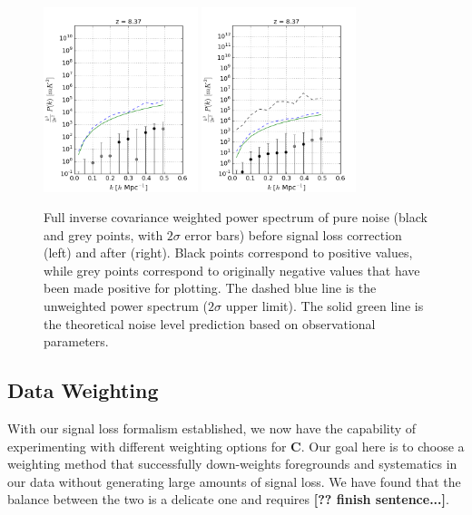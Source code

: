 \documentclass[preprint2,numberedappendix,tighten,twocolappendix]{aastex6}  %
\newcommand{\cc}[1]{{\color{purple} \textbf{[#1]}}}
\begin{document}
\begin{figure}
	\centering
	\includegraphics[width=0.4\textwidth]{plots/ps2_noise_nosigloss.png}
	\includegraphics[width=0.4\textwidth]{plots/ps2_noise.png}
	\caption{Full inverse covariance weighted power spectrum of pure noise (black and grey points, with $2\sigma$ error bars) before signal loss correction (left) and after (right). Black points correspond to positive values, while grey points correspond to originally negative values that have been made positive for plotting. The dashed blue line is the unweighted power spectrum ($2\sigma$ upper limit). The solid green line is the theoretical noise level prediction based on observational parameters.}
	\label{fig:ps2_noise}
\end{figure}

\subsection{Data Weighting}
\label{sec:Weight}

With our signal loss formalism established, we now have the capability of experimenting with different weighting options for $\textbf{C}$. Our goal here is to choose a weighting method that successfully down-weights foregrounds and systematics in our data without generating large amounts of signal loss. We have found that the balance between the two is a delicate one and requires \cc{?? finish sentence...}. 
\end{document}
